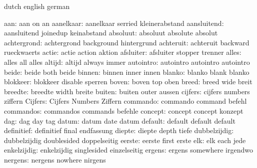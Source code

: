 
\startvariables       dutch                english             german

                aan:  aan                  on                  an
          aanelkaar:  aanelkaar            serried             kleinerabstand
        aansluitend:  aansluitend          joinedup            keinabstand
           absoluut:  absoluut             absolute            absolut
        achtergrond:  achtergrond          background          hintergrund
          achteruit:  achteruit            backward            rueckwaerts
              actie:  actie                action              aktion
          afsluiter:  afsluiter            stopper             trenner
              alles:  alles                all                 alles
             altijd:  altijd               always              immer
          autointro:  autointro            autointro           autointro
              beide:  beide                both                beide
             binnen:  binnen               inner               innen
             blanko:  blanko               blank               blanko
           blokkeer:  blokkeer             disable             sperren
              boven:  boven                top                 oben
              breed:  breed                wide                breit
            breedte:  breedte              width               breite
             buiten:  buiten               outer               aussen
            cijfers:  cijfers              numbers             ziffern
            Cijfers:  Cijfers              Numbers             Ziffern
           commando:  commando             command             befehl
          commandos:  commandos            commands            befehle
            concept:  concept              concept             konzept
                dag:  dag                  day                 tag
              datum:  datum                date                datum
            default:  default              default             default
         definitief:  definitief           final               endfassung
             diepte:  diepte               depth               tiefe
       dubbelzijdig:  dubbelzijdig         doublesided         doppelseitig
             eerste:  eerste               first               erste
                elk:  elk                  each                jede
        enkelzijdig:  enkelzijdig          singlesided         einzelseitig
             ergens:  ergens               somewhere           irgendwo
            nergens:  nergens              nowhere             nirgens
